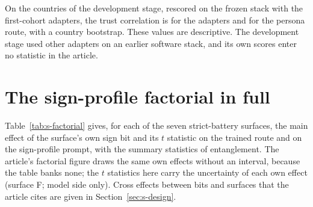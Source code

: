 \documentclass[12pt]{article}
\begin{document}
On the  countries of the development stage, rescored on the frozen stack with the first-cohort adapters, the trust correlation is   for the adapters and   for the persona route, with a country bootstrap. These values are descriptive. The development stage used other adapters on an earlier software stack, and its own scores enter no statistic in the article.

\section{The sign-profile factorial in full}\label{sec:s-factorial}

Table~\ref{tab:s-factorial} gives, for each of the seven strict-battery surfaces, the main effect of the surface's own sign bit and its $t$ statistic on the trained route and on the sign-profile prompt, with the summary statistics of entanglement. The article's factorial figure draws the same own effects without an interval, because the table banks none; the $t$ statistics here carry the uncertainty of each own effect (surface F; model side only). Cross effects between bits and surfaces that the article cites are given in Section~\ref{sec:s-design}.
\end{document}
